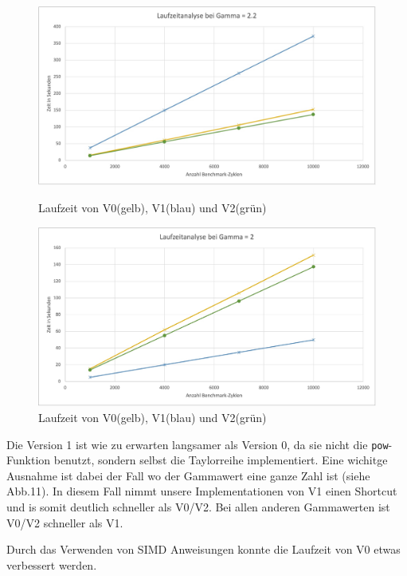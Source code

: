 \documentclass[course=erap]{aspdoc}
\begin{document}
\begin{figure}[h]
\begin{minipage}{0.55\textwidth}
\centering
\includegraphics[width=\textwidth]{Bilder/Laufzeit1.jpeg}
\caption{Laufzeit von V0(gelb), V1(blau) und V2(grün)}
\end{minipage}
\hfill
\begin{minipage}{0.55\textwidth}
\centering
\includegraphics[width=\textwidth]{Bilder/Laufzeit2.jpeg}
\caption{Laufzeit von V0(gelb), V1(blau) und V2(grün)}
\end{minipage}
\end{figure}
    
\par
Die Version 1 ist wie zu erwarten langsamer als Version 0, da sie nicht die \texttt{pow}-Funktion benutzt, sondern selbst die Taylorreihe implementiert. Eine wichitge Ausnahme ist dabei der Fall wo der Gammawert eine ganze Zahl ist (siehe Abb.11). In diesem Fall nimmt unsere Implementationen von V1 einen Shortcut und is somit deutlich schneller als V0/V2. Bei allen anderen Gammawerten ist V0/V2 schneller als V1. 

\par
Durch das Verwenden von SIMD Anweisungen konnte die Laufzeit von V0 etwas verbessert werden.
\end{document}
